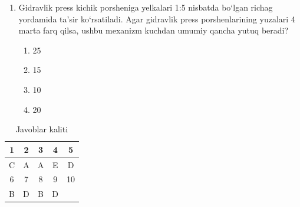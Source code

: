 \begin{enumerate}
\item Gidravlik press kichik porsheniga yelkalari 1:5 nisbatda bo‘lgan 
richag yordamida ta’sir ko‘rsatiladi. 
Agar gidravlik press porshenlarining yuzalari 4 marta farq qilsa, 
ushbu mexanizm kuchdan umumiy qancha yutuq beradi?

\begin{enumerate}[label=\Alph*)]
\item 25
\item 15
\item 10
\item 20
\end{enumerate}

\end{enumerate}




\begin{table}[h]
\centering
\begin{tabular}{|c|c|c|c|c|}
\hline
1 & 2 & 3 & 4 & 5 \\
\hline
C & A & A & E & D \\
\hline
6 & 7 & 8 & 9 & 10 \\
\hline
B & D & B & D &  \\
\hline
\end{tabular}
\caption{Javoblar kaliti}
\end{table}